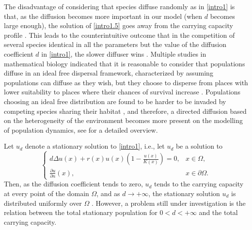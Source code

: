 \documentclass[11pt]{article}
\newcommand{\parentheses}[1]{\left(#1\right)}
\theoremstyle{definition}
\theoremstyle{remark}
\begin{document}
The disadvantage of considering that species diffuse randomly as in \eqref{intro1} is that, as the diffusion becomes more important in our model (when $d$ becomes large enough), the solution of \eqref{intro1.5}  goes away from the carrying capacity profile \cite{C1,C4,C2,C3}. 
This leads to the counterintuitive outcome that in the competition of several species identical in all the parameters but the value of the diffusion coefficient $d$ in \eqref{intro1},
the slower diffuser wins \cite{Dockery}. 
Multiple studies in mathematical biology indicated that it is reasonable to consider that populations diffuse in an ideal free dispersal framework, characterized by assuming populations can diffuse as they wish, but they choose to disperse from places with lower suitability to places where their chances of survival increase \cite{Bonte,CC1,CCL1}. Populations choosing an ideal free distribution are found to be harder to be invaded by competing species sharing their habitat \cite{CAMWA2016,C1,CCL2,Korobenko2012,Korobenko2014}, and therefore, a directed diffusion based on the heterogeneity of the environment becomes more present on the modelling of population dynamics, see \cite{CC_2025,C4} for a detailed overview. 

Let $u_d$ denote a stationary solution to \eqref{intro1}, i.e., let $u_d$ be a solution to
\begin{equation}\label{intro1.5}
    \begin{cases}
 \displaystyle             d\Delta u(x) +r(x)u (x) \parentheses{1-\frac{u(x)}{K(x)}}=0, &  x \in \Omega,\\
   \displaystyle           \frac{\partial u}{\partial n}(x) , &  x \in \partial\Omega.
    \end{cases} 
\end{equation}
Then, as the diffusion coefficient tends to zero, $u_d$ tends to the carrying capacity at every point of the domain $\Omega$,
and as $d \to +\infty$, the stationary solution $u_d$ is distributed uniformly over $\Omega$ \cite{Ang2016,Lou}. 
However, a problem still under investigation is the relation between the total stationary population for $0<d<+\infty$ and the total carrying capacity. 
\end{document}
